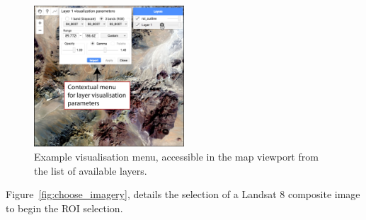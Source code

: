 \documentclass[12pt]{article}
\begin{document}
\vspace{2em}
\begin{figure}[htbp]
\centering
\includegraphics[width=0.5\textwidth]{images/layer_visualisation_reduced.jpg}
\caption{Example visualisation menu, accessible in the map viewport from the list of available layers.}
\label{fig:layer_visualisation}
\end{figure}

Figure~\ref{fig:choose_imagery}, details the selection of a Landsat 8 composite image to begin the ROI selection.
\end{document}
